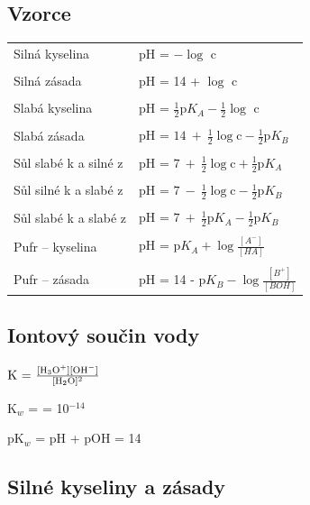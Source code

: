 \subsection{Vzorce}

\begin{tabular}{ll}
	Silná kyselina & pH = $-\log$ c \\
	& \\
	Silná zásada & pH = 14 + $\log$ c \\
	& \\
	Slabá kyselina & pH = $\frac{1}{2}\textrm{p}K_A-\frac{1}{2}\log$ c \\
	& \\
	Slabá zásada & pH = $14\ +\ \frac{1}{2}\log\textrm{c} - \frac{1}{2}\textrm{p}K_B$ \\
	& \\
	Sůl slabé k a silné z & pH = $7\ +\ \frac{1}{2}\log\textrm{c} + \frac{1}{2}\textrm{p}K_A$ \\
	& \\
	Sůl silné k a slabé z & pH = $7\ -\ \frac{1}{2}\log\textrm{c} - \frac{1}{2}\textrm{p}K_B$ \\
	& \\
	Sůl slabé k a slabé z & pH = $7\ +\ \frac{1}{2}\textrm{p}K_A - \frac{1}{2}\textrm{p}K_B$ \\
	& \\
	Pufr -- kyselina & pH = $\textrm{p}K_A + \log \frac{[A^-]}{[HA]}$ \\
	& \\
	Pufr -- zásada & pH = 14 - $\textrm{p}K_B - \log \frac{[B^+]}{[BOH]}$ \\
\end{tabular}

\newpage

\subsection{Iontový součin vody}

$\textrm{K = }\frac{[\ce{H3O+}][\ce{OH-}]}{[\ce{H2O}]^2}$

K$_w$ = \ce{[H3O+][OH-]} = 10$^{-14}$

pK$_w$ = pH + pOH = 14

\subsection{Silné kyseliny a zásady}

